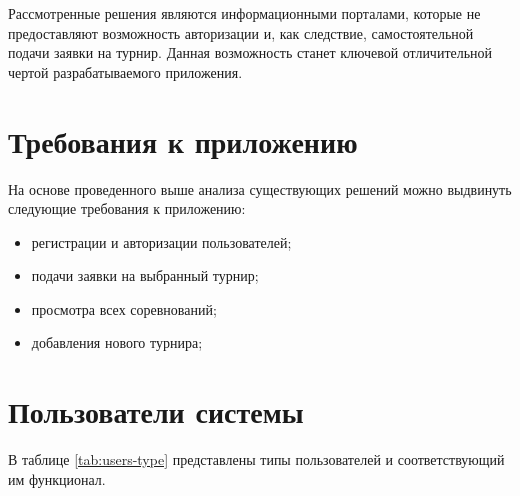 Рассмотренные решения являются информационными порталами, которые не предоставляют возможность авторизации и, как следствие, самостоятельной подачи заявки на турнир. Данная возможность станет ключевой отличительной чертой разрабатываемого приложения.

\section{Требования к приложению}

На основе проведенного выше анализа существующих решений можно выдвинуть следующие требования к приложению:

\begin{itemize}
	\item регистрации и авторизации пользователей;
	\item подачи заявки на выбранный турнир;
	\item просмотра всех соревнований;
	\item добавления нового турнира;
\end{itemize}

\section{Пользователи системы}

В таблице \ref{tab:users-type} представлены типы пользователей и соответствующий им функционал.

\begin{table}[H]
	\centering
	\caption{Типы пользователей}
	\renewcommand{\arraystretch}{1.8}
\label{tab:users-type}
\end{table}

